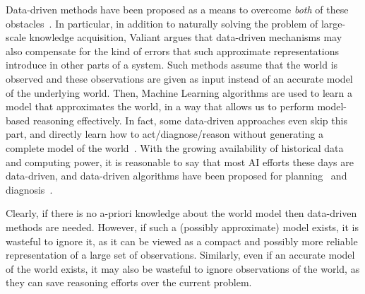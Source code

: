 \documentclass[12pt]{article}
\newcommand{\note}[1]{\textbf{\textit{#1}}}
\begin{document}
Data-driven methods have been proposed as a means to overcome {\em both} of these obstacles~\cite{valiant2000neuroidal,valiant2000robustLogics}. In particular, in addition to naturally solving the problem of large-scale knowledge acquisition, Valiant argues that data-driven mechanisms may also compensate for the kind of errors that such approximate representations %
introduce in other parts of a system. Such methods assume that the world is observed and these observations are given as input instead of an accurate model of the underlying world. Then, Machine Learning algorithms are used to learn a model that approximates the world, 
in a way that allows us to perform model-based reasoning effectively. 
In fact, some data-driven approaches even skip this part, and directly learn how to act/diagnose/reason without generating a complete model of the world~\cite{kearns2002POMDPsample}. %
With the growing availability of historical data and computing power, it is reasonable to say that most AI efforts these days are data-driven,
and data-driven algorithms have been proposed for  planning~\cite{fern2011first,juba2016jmlr} and diagnosis~\cite{keren2011model,qin2012survey}.



Clearly, if there is no a-priori knowledge about the world model then data-driven methods are needed. However, if such a (possibly approximate) model exists, it is wasteful to ignore it, as it can be viewed as a compact and possibly more reliable representation of a large set of observations. Similarly, even if an accurate model of the world exists, it may also be wasteful to ignore observations of the world, as they can save reasoning efforts over the current problem. 
\end{document}
